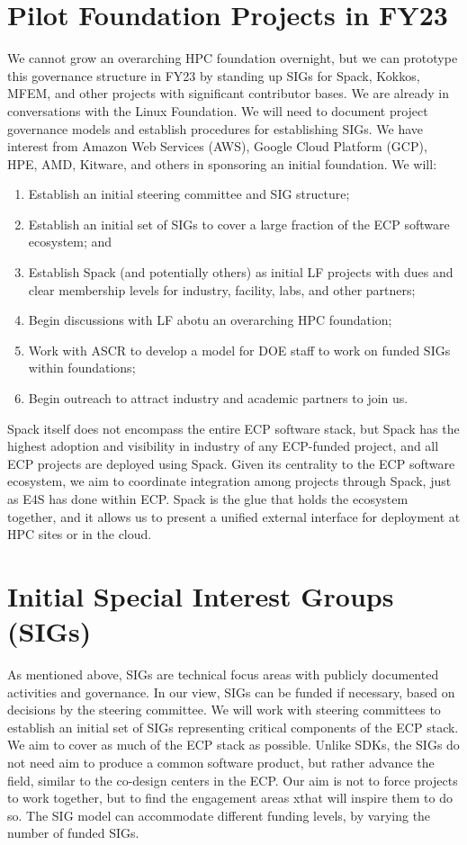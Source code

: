 \documentclass[11pt]{article}
\begin{document}
\section{Pilot Foundation Projects in FY23}

We cannot grow an overarching HPC foundation overnight, but we can prototype this
governance structure in FY23 by standing up SIGs for Spack, Kokkos, MFEM, and other
projects with significant contributor bases. We are already in conversations with the
Linux Foundation. We will need to document project governance models and establish
procedures for establishing SIGs. We have interest from Amazon Web Services (AWS),
Google Cloud Platform (GCP), HPE, AMD, Kitware, and others in sponsoring an initial
foundation. We will:

\begin{enumerate}
\item Establish an initial steering committee and SIG structure;
\item Establish an initial set of SIGs to cover a large fraction of the ECP software
  ecosystem; and
\item Establish Spack (and potentially others) as initial LF projects with dues and
  clear membership levels for industry, facility, labs, and other partners;
\item Begin discussions with LF abotu an overarching HPC foundation;
\item Work with ASCR to develop a model for DOE staff to work on funded SIGs within
  foundations;
\item Begin outreach to attract industry and academic partners to join us.
\end{enumerate}

Spack itself does not encompass the entire ECP software stack, but Spack has the highest
adoption and visibility in industry of any ECP-funded project, and all ECP projects are
deployed using Spack. Given its centrality to the ECP software ecosystem, we aim to
coordinate integration among projects through Spack, just as E4S has done within ECP.
Spack is the glue that holds the ecosystem together, and it allows us to present a
unified external interface for deployment at HPC sites or in the cloud.

\section{Initial Special Interest Groups (SIGs)}

As mentioned above, SIGs are technical focus areas with publicly documented activities
and governance. In our view, SIGs can be funded if necessary, based on decisions by the
steering committee. We will work with steering committees to establish an initial set of
SIGs representing critical components of the ECP stack. We aim to cover as much of the
ECP stack as possible. Unlike SDKs, the SIGs do not need aim to produce a common
software product, but rather advance the field, similar to the co-design centers in the
ECP. Our aim is not to force projects to work together, but to find the engagement areas
xthat will inspire them to do so. The SIG model can accommodate different funding levels,
by varying the number of funded SIGs.
\end{document}
